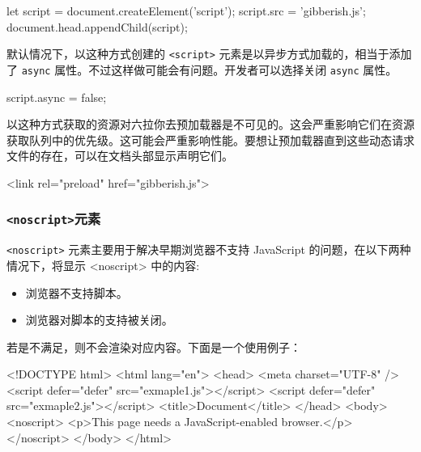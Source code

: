 \begin{JavaScript}
let script = document.createElement('script');
script.src = 'gibberish.js';
document.head.appendChild(script);
\end{JavaScript}

默认情况下，以这种方式创建的 \texttt{<script>} 元素是以异步方式加载的，相当于添加了 \texttt{async} 属性。不过这样做可能会有问题。开发者可以选择关闭 \texttt{async} 属性。

\begin{JavaScript}
script.async = false;
\end{JavaScript}

以这种方式获取的资源对六拉你去预加载器是不可见的。这会严重影响它们在资源获取队列中的优先级。这可能会严重影响性能。要想让预加载器直到这些动态请求文件的存在，可以在文档头部显示声明它们。

\begin{HTML}
<link rel="preload" href="gibberish.js">
\end{HTML}

\subsubsection*{\texttt{<noscript>}元素}

\texttt{<noscript>} 元素主要用于解决早期浏览器不支持 JavaScript 的问题，在以下两种情况下，将显示 <noscript> 中的内容:

\begin{itemize}
    \item 浏览器不支持脚本。
    \item 浏览器对脚本的支持被关闭。
\end{itemize}

若是不满足，则不会渲染对应内容。下面是一个使用例子：

\begin{JavaScript}
<!DOCTYPE html>
<html lang="en">
  <head>
    <meta charset="UTF-8" />
    <script defer="defer" src="exmaple1.js"></script>
    <script defer="defer" src="exmaple2.js"></script>
    <title>Document</title>
  </head>
  <body>
    <noscript>
      <p>This page needs a JavaScript-enabled browser.</p>
    </noscript>
  </body>
</html>
\end{JavaScript}

\newpage